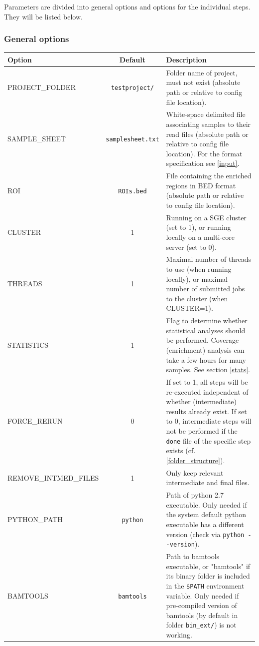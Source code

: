 \documentclass{article}
\begin{document}
Parameters are divided into general options and options for the individual steps. They will be listed below.

\newpage
\subsubsection*{General options}

\begin{longtable}[h]{lcp{6.5cm}}
	\toprule
	\bf Option & \bf Default & \bf Description\\ \midrule
	PROJECT\_FOLDER & \verb|testproject/| & Folder name of project, must not exist (absolute path or relative to config file location).\\ 
	SAMPLE\_SHEET & \verb|samplesheet.txt| & White-space delimited file associating samples to their read files (absolute path or relative to config file location). For the format specification see \ref{input}.\\
	ROI & \verb|ROIs.bed| & File containing the enriched regions in BED format (absolute path or relative to config file location).\\
	CLUSTER & 1 & Running on a SGE cluster (set to 1), or running locally on a multi-core server (set to 0).\\
	THREADS & 1 & Maximal number of threads to use (when running locally), or maximal number of submitted jobs to the cluster (when CLUSTER=1).\\
	STATISTICS & 1 & Flag to determine whether statistical analyses should be performed. Coverage (enrichment) analysis can take a few hours for many samples. See section \ref{stats}.\\
	FORCE\_RERUN & 0 & If set to 1, all steps will be re-executed independent of whether (intermediate) results already exist. If set to 0, intermediate steps will not be performed if the \verb|done| file of the specific step exists (cf. \ref{folder_structure}).\\
	REMOVE\_INTMED\_FILES & 1 & Only keep relevant intermediate and final files.\\
	PYTHON\_PATH & \verb|python| & Path of python 2.7 executable. Only needed if the system default python executable has a different version (check via \verb|python --version|).\\
	BAMTOOLS & \verb|bamtools| & Path to bamtools executable, or "bamtools" if its binary folder is included in the \verb|$PATH| environment variable. Only needed if pre-compiled version of bamtools (by default in folder \verb|bin_ext/|) is not working.\\
	\bottomrule
\end{longtable}
\end{document}

